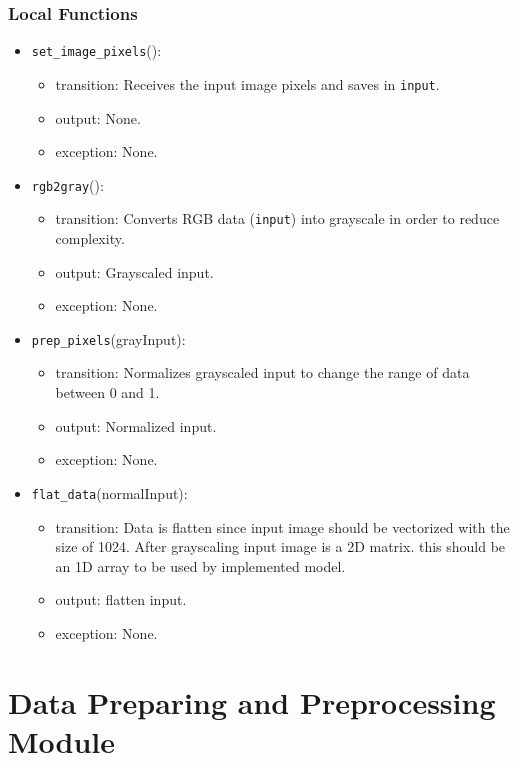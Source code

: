 \documentclass[12pt, titlepage]{article}
\def\code#1{\texttt{#1}}
\begin{document}
\subsubsection{Local Functions}
\begin{itemize}
  \item \code{set\_image\_pixels}():
  \begin{itemize}
    \item transition: Receives the input image pixels and saves in \code{input}.
    \item output: None.
    \item exception: None.
  \end{itemize}

  \item \code{rgb2gray}():
  \begin{itemize}
    \item transition: Converts RGB data (\code{input}) into grayscale in order to reduce complexity. 
    \item output: Grayscaled input.
    \item exception: None.
  \end{itemize}
  \item \code{prep\_pixels}(grayInput):
  \begin{itemize}
    \item transition: Normalizes grayscaled input to change the range of data between 0 and 1.
    \item output: Normalized input.
    \item exception: None.
  \end{itemize}
  \item \code{flat\_data}(normalInput):
  \begin{itemize}
    \item transition: Data is flatten since input image should be vectorized with the size of 1024. 
    After grayscaling input image is a 2D matrix. this should be an 1D array to be used by implemented model.
    \item output: flatten input.
    \item exception: None.
  \end{itemize}

\end{itemize}

\section{Data Preparing and Preprocessing Module} \label{Data} 
\end{document}
